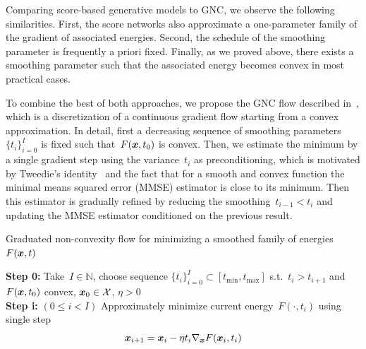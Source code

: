 \documentclass{article}
\newcommand{\N}{\mathbb{N}}
\newcommand{\X}{\mathcal{X}}
\newcommand{\tmin}{t_\mathrm{min}}
\newcommand{\tmax}{t_\mathrm{max}}
\theoremstyle{plain}
\theoremstyle{definition}
\theoremstyle{remark}
\begin{document}
Comparing score-based generative models to GNC, we observe the following similarities.
First, the score networks also approximate a one-parameter family of the gradient of associated energies.
Second, the schedule of the smoothing parameter is frequently a priori fixed.
Finally, as we proved above, there exists a smoothing parameter such that the associated energy becomes convex in most practical cases.

To combine the best of both approaches, we propose the GNC flow described in~, which is a discretization of a continuous gradient flow starting from a convex approximation.
In detail, first a decreasing sequence of smoothing parameters~$\{t_i\}_{i=0}^I$ is fixed such that~$F({\bm{x}},t_0)$ is convex.
Then, we estimate the minimum by a single gradient step using the variance~$t_i$ as preconditioning, which is motivated by Tweedie's identity~\citep{Ro56,Ef11} and the fact that for a smooth and convex function the minimal means squared error (MMSE) estimator is close to its minimum.
Then this estimator is gradually refined by reducing the smoothing~$t_{i-1}<t_i$ and updating the MMSE estimator conditioned on the previous result.

\begin{algorithm}
\caption{Graduated non-convexity flow for minimizing a smoothed family of energies~$F({\bm{x}},t)$}\label{alg:graduatedNC}
\textbf{Step 0:} Take~$I\in\N$, choose sequence $\{t_i\}_{i=0}^I\subset[\tmin,\tmax]$ s.t.~$t_{i}>t_{i+1}$ and~$F({\bm{x}},t_0)$ convex, $\vx_0\in\X$, $\eta>0$ \\
\textbf{Step i:} $(0\leq i< I)$ 
Approximately minimize current energy~$F(\cdot,t_i)$ using single step
\[
{\bm{x}}_{i+1}={\bm{x}}_i-\eta t_i\nabla_{\bm{x}} F({\bm{x}}_i,t_i)
\] 
\end{algorithm}
\end{document}
